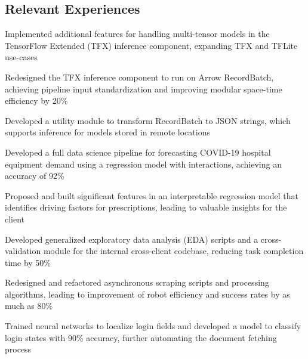 \documentclass{mxresume}
\begin{document}
\vdivider
%
\begin{minipage}[t]{0.73\textwidth}
\begin{resumebody}
\begin{large}
%
\section*{Relevant Experiences}
%
\begin{tightemize}{5mm}
\item Implemented additional features for handling multi-tensor models in the TensorFlow Extended (TFX) inference component, expanding TFX and TFLite use-cases
\item Redesigned the TFX inference component to run on Arrow RecordBatch, achieving pipeline input standardization and improving modular space-time efficiency by 20\textsc{\%}
\item Developed a utility module to transform RecordBatch to JSON strings, which supports inference for models stored in remote locations
\end{tightemize}
%
%
\begin{tightemize}{5mm}
\item Developed a full data science pipeline for forecasting COVID-19 hospital equipment demand using a regression model with interactions, achieving an accuracy of 92\textsc{\%}
\item Proposed and built significant features in an interpretable regression model that identifies driving factors for prescriptions, leading to valuable insights for the client
\item Developed generalized exploratory data analysis (EDA) scripts and a cross-validation module for the internal cross-client codebase, reducing task completion time by 50\textsc{\%}
\end{tightemize}
%
%
\begin{tightemize}{5mm}
\item Redesigned and refactored asynchronous scraping scripts and processing algorithms, leading to improvement of robot efficiency and success rates by as much as 80\textsc{\%}
\item Trained neural networks to localize login fields and developed a model to classify login states with 90\textsc{\%} accuracy, further automating the document fetching process
\end{tightemize}
%
%

\end{large}
\end{resumebody}
\end{minipage}
\end{document}
